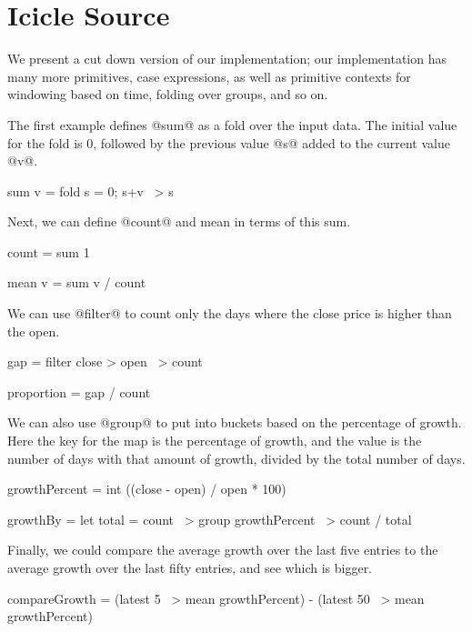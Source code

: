 \section{Icicle Source}
\label{s:Source}

We present a cut down version of our implementation; our implementation has many more primitives, case expressions, as well as primitive contexts for windowing based on time, folding over groups, and so on.

The first example defines @sum@ as a fold over the input data.
The initial value for the fold is $0$, followed by the previous value @s@ added to the current value @v@.
\begin{code}
sum v
 =  fold s = 0; s+v
 ~> s
\end{code}

Next, we can define @count@ and mean in terms of this sum.
\begin{code}
count
 =  sum 1

mean v
 =  sum v / count
\end{code}

We can use @filter@ to count only the days where the close price is higher than the open.
\begin{code}
gap
 =  filter close > open
 ~> count

proportion
 =  gap / count
\end{code}

We can also use @group@ to put into buckets based on the percentage of growth.
Here the key for the map is the percentage of growth, and the value is the number of days with that amount of growth, divided by the total number of days.
\begin{code}
growthPercent
 =  int ((close - open) / open * 100)

growthBy
 =  let total = count
 ~> group growthPercent
 ~> count / total
\end{code}

Finally, we could compare the average growth over the last five entries to the average growth over the last fifty entries, and see which is bigger.
\begin{code}
compareGrowth
 =  (latest 5  ~> mean growthPercent)
 -  (latest 50 ~> mean growthPercent)

\end{code}



